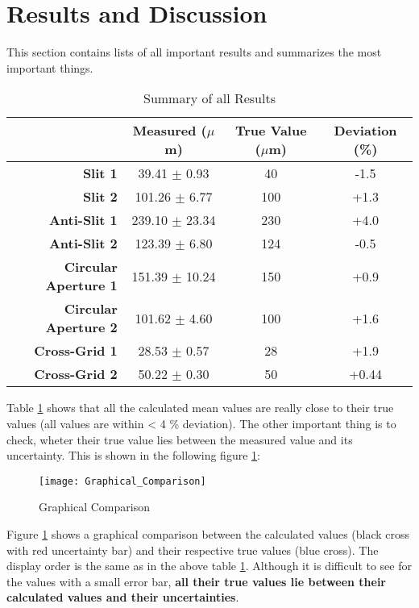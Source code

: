 \section{Results and Discussion}
\label{sec:Results_and_Discussion}
This section contains lists of all important results and summarizes the most important things.

\begin{table}[H]
	\centering
	\renewcommand{\arraystretch}{1.3}
	\begin{tabular}{r||c|c|c}
		& \textbf{Measured} ($\mu$m) & \textbf{True Value} ($\mu$m) & \textbf{Deviation} (\%) \\
		\hline\hline
		\textbf{Slit 1} & 39.41 $\pm$ 0.93 & 40 & -1.5 \\
		\textbf{Slit 2} & 101.26 $\pm$ 6.77 & 100 & +1.3 \\ \hline
		\textbf{Anti-Slit 1} & 239.10 $\pm$ 23.34 & 230 & +4.0 \\
		\textbf{Anti-Slit 2} & 123.39 $\pm$ 6.80 & 124 & -0.5 \\ \hline
		\textbf{Circular Aperture 1} & 151.39 $\pm$ 10.24 & 150 & +0.9 \\
		\textbf{Circular Aperture 2} & 101.62 $\pm$ 4.60 & 100 & +1.6 \\ \hline
		\textbf{Cross-Grid 1} & 28.53 $\pm$ 0.57 & 28 & +1.9 \\
		\textbf{Cross-Grid 2} & 50.22 $\pm$ 0.30 & 50 & +0.44 \\ \hline
	\end{tabular}
	\caption{Summary of all Results}
	\label{tab:results}
\end{table}

Table \ref{tab:results} shows that all the calculated mean values are really close to their true values (all values are within < 4 \% deviation). The other important thing is to check, wheter their true value lies between the measured value and its uncertainty. This is shown in the following figure \ref{fig:Graphical_Comparison}:

\begin{figure}[H]
	\centering
	\texttt{[image: Graphical\_Comparison]}
	\caption{Graphical Comparison}
	\label{fig:Graphical_Comparison}
\end{figure}

Figure \ref{fig:Graphical_Comparison} shows a graphical comparison between the calculated values (black cross with red uncertainty bar) and their respective true values (blue cross). The display order is the same as in the above table \ref{tab:results}. Although it is difficult to see for the values with a small error bar, \textbf{all their true values lie between their calculated values and their uncertainties}.
